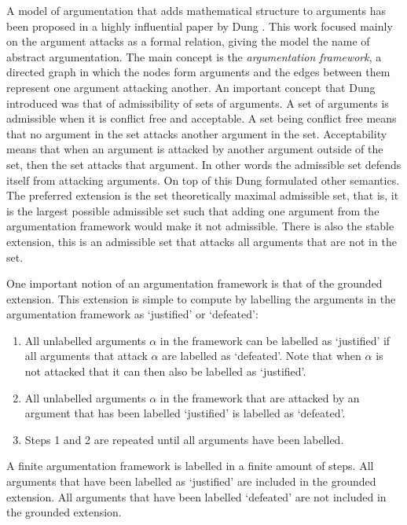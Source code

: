 A model of argumentation that adds mathematical structure to arguments has been
proposed in a highly influential paper by Dung \cite{dung1995}.
This work focused mainly on the argument attacks as a formal relation, giving
the model the name of abstract argumentation. The main concept is the
\emph{argumentation framework}, a directed graph in which the nodes form
arguments and the edges between them represent one argument attacking another.
An important concept that Dung introduced was that of admissibility of sets of
arguments. A set of arguments is admissible when it is conflict free and
acceptable. A set being conflict free means that no argument in the set attacks
another argument in the set. Acceptability means that when an argument is
attacked by another argument outside of the set, then the set attacks that
argument. In other words the admissible set defends itself from attacking
arguments. On top of this Dung formulated other semantics. The preferred
extension is the set theoretically maximal admissible set, that is, it is the
largest possible admissible set such that adding one argument from the
argumentation framework would make it not admissible. There is also the stable
extension, this is an admissible set that attacks all arguments that are not in
the set.

One important notion of an argumentation framework is that of the grounded
extension. This extension is simple to compute by labelling the arguments in
the argumentation framework as `justified' or `defeated':
\begin{enumerate}
	\item All unlabelled arguments $\alpha$ in the framework can be labelled as
	`justified' if all arguments that attack $\alpha$ are labelled as
	`defeated'. Note that when $\alpha$ is not attacked that it can then also
	be labelled as `justified'.
	\item All unlabelled arguments $\alpha$ in the framework that are attacked
	by an argument that has been labelled `justified' is labelled as `defeated'.
	\item Steps 1 and 2 are repeated until all arguments have been labelled.
\end{enumerate}
A finite argumentation framework is labelled in a finite amount of steps. All
arguments that have been labelled as `justified' are included in the grounded
extension. All arguments that have been labelled `defeated' are not included in
the grounded extension.

